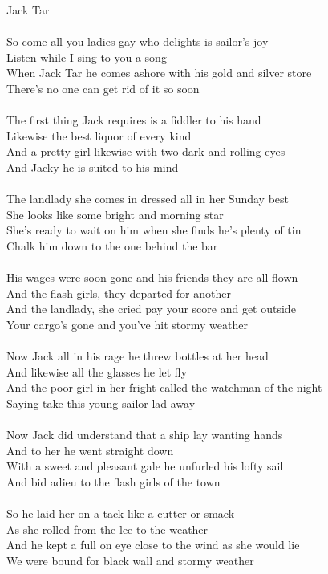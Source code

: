 \documentclass[letterpaper,9pt]{article}
\begin{document}
\newpage
{}
\huge
Jack Tar\\
\\
\Large
\noindent
So come all you ladies gay who delights is sailor’s joy
\\Listen while I sing to you a song
\\When Jack Tar he comes ashore with his gold and silver store
\\There’s no one can get rid of it so soon
\\
\\The first thing Jack requires is a fiddler to his hand
\\Likewise the best liquor of every kind
\\And a pretty girl likewise with two dark and rolling eyes
\\And Jacky he is suited to his mind
\\
\\The landlady she comes in dressed all in her Sunday best
\\She looks like some bright and morning star
\\She’s ready to wait on him when she finds he’s plenty of tin
\\Chalk him down to the one behind the bar
\\
\\His wages were soon gone and his friends they are all flown
\\And the flash girls, they departed for another
\\And the landlady, she cried pay your score and get outside
\\Your cargo’s gone and you’ve hit stormy weather
\\
\\Now Jack all in his rage he threw bottles at her head
\\And likewise all the glasses he let fly
\\And the poor girl in her fright called the watchman of the night
\\Saying take this young sailor lad away
\\
\\Now Jack did understand that a ship lay wanting hands
\\And to her he went straight down
\\With a sweet and pleasant gale he unfurled his lofty sail
\\And bid adieu to the flash girls of the town
\\
\\So he laid her on a tack like a cutter or smack
\\As she rolled from the lee to the weather
\\And he kept a full on eye close to the wind as she would lie
\\We were bound for black wall and stormy weather
\end{document}
